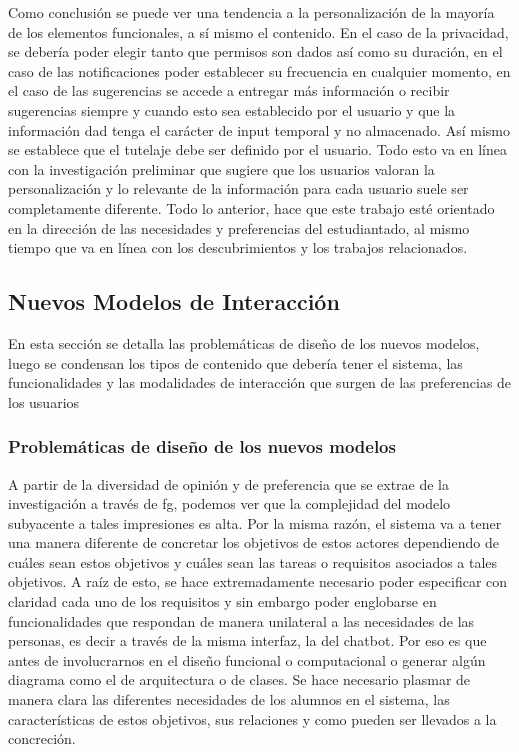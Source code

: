     \par Como conclusión se puede ver una tendencia a la personalización de la mayoría de los elementos funcionales, a sí mismo el contenido. En el caso de la privacidad, se debería poder elegir tanto que permisos son dados así como su duración, en el caso de las notificaciones poder establecer su frecuencia en cualquier momento, en el caso de las sugerencias se accede a entregar más información o recibir sugerencias siempre y cuando esto sea establecido por el usuario y que la información dad tenga el carácter de input temporal y no almacenado. Así mismo se establece que el tutelaje debe ser definido por el usuario. Todo esto va en línea con la investigación preliminar que sugiere que los usuarios valoran la personalización y lo relevante de la información para cada usuario suele ser completamente diferente. Todo lo anterior, hace que este trabajo esté orientado en la dirección de las necesidades y preferencias del estudiantado, al mismo tiempo que va en línea con los descubrimientos y los trabajos relacionados.

\subsection{Nuevos Modelos de Interacción}
    \par En esta sección se detalla las problemáticas de diseño de los nuevos modelos, luego se condensan los tipos de contenido que debería tener el sistema, las funcionalidades y las modalidades de interacción que surgen de las preferencias de los usuarios
    \subsubsection{Problemáticas de diseño de los nuevos modelos}
    \par A partir de la diversidad de opinión y de preferencia que se extrae de la investigación a través de \acrshort{fg}, podemos ver que la complejidad del modelo subyacente a tales impresiones es alta. Por la misma razón, el sistema va a tener una manera diferente de concretar los objetivos de estos actores dependiendo de cuáles sean estos objetivos y cuáles sean las tareas o requisitos asociados a tales objetivos. A raíz de esto, se hace extremadamente necesario poder especificar con claridad cada uno de los requisitos y sin embargo poder englobarse en funcionalidades que respondan de manera unilateral a las necesidades de las personas, es decir a través de la misma interfaz, la del chatbot. Por eso es que antes de involucrarnos en el diseño funcional o computacional o generar algún diagrama como el de arquitectura o de clases. Se hace necesario plasmar de manera clara las diferentes necesidades de los alumnos en el sistema, las características de estos objetivos, sus relaciones y como pueden ser llevados a la concreción.
    
